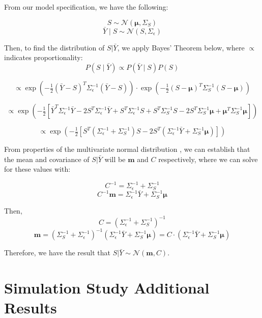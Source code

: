 \documentclass[11pt]{article}
\begin{document}
From our model specification, we have the following:

\[
S \sim \mathcal{N}(\boldsymbol{\mu}, \Sigma_S)
\]
\[
\bar{Y} \mid S \sim \mathcal{N}(S, \Sigma_\epsilon)
\]

Then, to find the distribution of $S|\bar{Y}$, we apply Bayes' Theorem below, 
where $\propto$ indicates proportionality:
\[
P(S \mid \bar{Y}) \propto P(\bar{Y} \mid S) P(S)
\]

\[
\propto \exp\left(-\tfrac{1}{2} (\bar{Y} - S)^T \Sigma_\epsilon^{-1} (\bar{Y} - S) \right) 
\cdot \exp\left(-\tfrac{1}{2} (S - \boldsymbol{\mu})^T \Sigma_S^{-1} (S - \boldsymbol{\mu})\right)
\]

\[
\propto \exp\left(-\tfrac{1}{2} \left[ \bar{Y}^T \Sigma_\epsilon^{-1} \bar{Y} 
- 2 S^T \Sigma_\epsilon^{-1} \bar{Y} + S^T \Sigma_\epsilon^{-1} S + S^T \Sigma_S^{-1} S 
- 2 S^T \Sigma_S^{-1} \boldsymbol{\mu} + \boldsymbol{\mu}^T \Sigma_S^{-1} \boldsymbol{\mu} \right] \right)
\]

\[
\propto \exp\left( -\tfrac{1}{2} \left[ S^T (\Sigma_\epsilon^{-1} + \Sigma_S^{-1}) S 
- 2 S^T (\Sigma_\epsilon^{-1} \bar{Y} + \Sigma_S^{-1} \boldsymbol{\mu}) \right] \right)
\]

From properties of the multivariate normal distribution \citep[e.g., Equation 7.1 of][]{hoff2009first},
we can establish that the mean and covariance of $S|\bar{Y}$ will be $\boldsymbol{m}$
and $C$ respectively, where we can solve for these values with:

\[
C^{-1} = \Sigma_\epsilon^{-1} + \Sigma_S^{-1}
\]
\[
C^{-1} \boldsymbol{m} = \Sigma_\epsilon^{-1} \bar{Y} + \Sigma_S^{-1} \boldsymbol{\mu}
\]

Then,
\[
C = (\Sigma_\epsilon^{-1} + \Sigma_S^{-1})^{-1}
\]
\[
\boldsymbol{m} = \left( \Sigma_S^{-1} + \Sigma_\epsilon^{-1} \right)^{-1} 
\left( \Sigma_\epsilon^{-1} \bar{Y} + \Sigma_S^{-1} \boldsymbol{\mu} \right)
= C \cdot \left( \Sigma_\epsilon^{-1} \bar{Y} + \Sigma_S^{-1} \boldsymbol{\mu} \right)
\]

Therefore, we have the result that $S|\bar{Y} \sim \mathcal{N}(\boldsymbol{m}, C)$.

\section{Simulation Study Additional Results}
\label{sec:apdx_sims}
\end{document}

